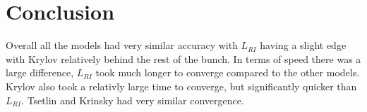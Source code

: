 \documentclass{article}
\begin{document}
\section{Conclusion}
Overall all the models had very similar accuracy with $L_{RI}$ having a slight edge with Krylov relatively behind the rest of the bunch. In terms of speed there was a large difference, $L_{RI}$ took much longer to converge compared to the other models. Krylov also took a relativly large time to converge, but significantly quicker than $L_{RI}$. Tsetlin and Krinsky had very similar convergence. 
\end{document}
